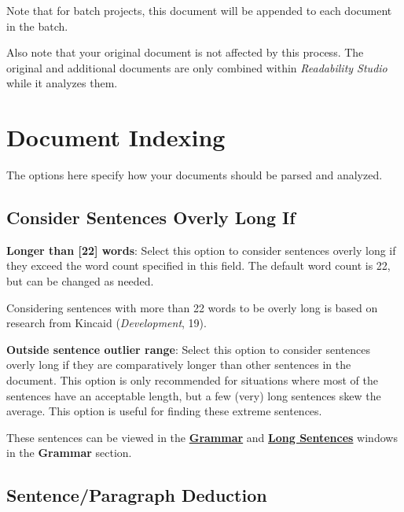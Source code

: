 \documentclass[
]{book}
\theoremstyle{definition}
\theoremstyle{definition}
\theoremstyle{definition}
\theoremstyle{definition}
\theoremstyle{remark}
\begin{document}
Note that for batch projects, this document will be appended to each document in the batch.

Also note that your original document is not affected by this process. The original and additional documents are only combined within \emph{Readability Studio} while it analyzes them.

\newpage

\hypertarget{document-analysis}{%
\section{Document Indexing}\label{document-analysis}}

The options here specify how your documents should be parsed and analyzed.

\hypertarget{consider-sentences-overly-long-if}{%
\subsection*{Consider Sentences Overly Long If}\label{consider-sentences-overly-long-if}}

\textbf{Longer than {[}22{]} words}: Select this option to consider sentences overly long if they exceed the word count specified in this field. The default word count is 22, but can be changed as needed.

Considering sentences with more than 22 words to be overly long is based on research from Kincaid (\emph{Development}, 19).

\textbf{Outside sentence outlier range}: Select this option to consider sentences overly long if they are comparatively longer than other sentences in the document. This option is only recommended for situations where most of the sentences have an acceptable length, but a few (very) long sentences skew the average. This option is useful for finding these extreme sentences.

These sentences can be viewed in the \protect\hyperlink{reviewing-standard-grammar}{\textbf{Grammar}} and \protect\hyperlink{reviewing-sentences-breakdown}{\textbf{Long Sentences}} windows in the \textbf{Grammar} section.

\hypertarget{options-sentence-deduction}{%
\subsection*{Sentence/Paragraph Deduction}\label{options-sentence-deduction}}
\end{document}
